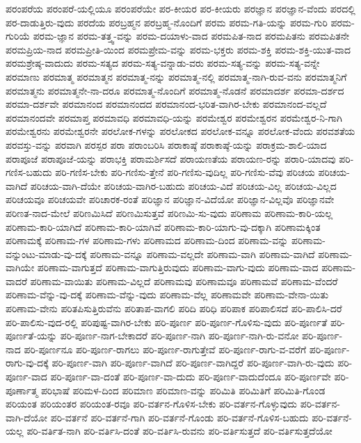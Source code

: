 {ಪರಂಪರೆಯ
ಪರಂಪರೆ-ಯಲ್ಲಿಯೂ
ಪರಂಪರೆಯೇ
ಪರ-ಕೀಯರ
ಪರ-ಕೀಯರು
ಪರಜ್ಞಾನ
ಪರಜ್ಞಾನ-ವೆಂದು
ಪರದಲ್ಲಿ
ಪರ-ದಾಡುತ್ತಿರು-ವುದು
ಪರದೆಯ
ಪರಬ್ರಹ್ಮನ
ಪರಬ್ರಹ್ಮ-ನೊಂದಿಗೆ
ಪರಮ
ಪರಮ-ಗತಿ-ಯನ್ನು
ಪರಮ-ಗುರಿ
ಪರಮ-ಗುರಿಯೆ
ಪರಮ-ಜ್ಞಾನ
ಪರಮ-ತತ್ತ್ವ-ವನ್ನು
ಪರಮ-ದಯಾಳು-ವಾದ
ಪರಮಪಿತ-ನಾದ
ಪರಮಪಿತನು
ಪರಮಪಿತನೇ
ಪರಮಪ್ರಿಯ-ನಾದ
ಪರಮಪ್ರೀತಿ-ಯಿಂದ
ಪರಮಪ್ರೇಮ-ವನ್ನು
ಪರಮ-ಭಕ್ತರು
ಪರಮ-ಶಕ್ತಿ
ಪರಮ-ಶಕ್ತಿ-ಯುತ-ವಾದ
ಪರಮಶ್ರೇಷ್ಠ-ವಾದುದು
ಪರಮ-ಸತ್ಯದ
ಪರಮ-ಸತ್ಯ-ವನ್ನಾಡು-ವರು
ಪರಮ-ಸತ್ಯ-ವನ್ನು
ಪರಮ-ಸತ್ಯ-ವನ್ನೇ
ಪರಮಾಣು
ಪರಮಾತ್ಮ
ಪರಮಾತ್ಮನ
ಪರಮಾತ್ಮ-ನನ್ನು
ಪರಮಾತ್ಮ-ನಲ್ಲಿ
ಪರಮಾತ್ಮ-ನಾಗಿ-ರುವ-ವನು
ಪರಮಾತ್ಮನಿಗೆ
ಪರಮಾತ್ಮನು
ಪರಮಾತ್ಮನೇ-ನಾ-ದರೂ
ಪರಮಾತ್ಮ-ನೊಂದಿಗೆ
ಪರಮಾತ್ಮ-ನೊಡನೆ
ಪರಮಾದರ್ಶ
ಪರಮಾ-ದರ್ಶದ
ಪರಮಾ-ದರ್ಶವೇ
ಪರಮಾನಂದ
ಪರಮಾನಂದದ
ಪರಮಾನಂದ-ಭರಿತ-ವಾಗಿರ-ಬೇಕು
ಪರಮಾನಂದ-ವಲ್ಲದೆ
ಪರಮಾನಂದವೇ
ಪರಮಾಪ್ತ
ಪರಮಾವಧಿ
ಪರಮಾವಧಿ-ಯನ್ನು
ಪರಮೇಶ್ವರ
ಪರಮೇಶ್ವರನ
ಪರಮೇಶ್ವರ-ನಿ-ಗಾಗಿ
ಪರಮೇಶ್ವರನು
ಪರಮೇಶ್ವರನೇ
ಪರಲೋಕ-ಗಳನ್ನು
ಪರಲೋಕದ
ಪರಲೋಕ-ವನ್ನೂ
ಪರಲೋಕ-ವೆಂದು
ಪರವಶತೆಯ
ಪರವಸ್ತು-ವನ್ನು
ಪರವಾಗಿ
ಪರಸ್ಪರ
ಪರಾ
ಪರಾಂಬರಿಸಿ
ಪರಾಕಾಷ್ಠೆ
ಪರಾಕಾಷ್ಠೆ-ಯನ್ನು
ಪರಾಕ್ರಮ-ಶಾಲಿ-ಯಾದ
ಪರಾಪೂಜೆ
ಪರಾಪೂಜೆ-ಯನ್ನು
ಪರಾಭಕ್ತಿ
ಪರಾಮರ್ಶಿಸದೆ
ಪರಾಯಣತೆಯ
ಪರಾಯಣ-ರನ್ನು
ಪರಾರಿ-ಯಾದವು
ಪರಿ-ಗಣಿಸ-ಬಹುದು
ಪರಿ-ಗಣಿಸ-ಬೇಕು
ಪರಿ-ಗಣಿಸು-ತ್ತೇನೆ
ಪರಿ-ಗಣಿಸು-ವುದಿಲ್ಲ
ಪರಿ-ಗಣಿಸು-ವೆವು
ಪರಿಚಯ
ಪರಿಚಯ-ವಾಗಿದೆ
ಪರಿಚಯ-ವಾಗಿ-ದೆಯೇ
ಪರಿಚಯ-ವಾಗಿರ-ಬಹುದು
ಪರಿಚಯ-ವಿದೆ
ಪರಿಚಯ-ವಿಲ್ಲ
ಪರಿಚಯ-ವಿಲ್ಲದ
ಪರಿಚಯವೂ
ಪರಿಚಯವೇ
ಪರಿಚಾರಕ-ರಂತೆ
ಪರಿಜ್ಞಾನ
ಪರಿಜ್ಞಾನ-ವಿದೆಯೋ
ಪರಿಜ್ಞಾನ-ವಿಲ್ಲವೊ
ಪರಿಜ್ಞಾನವೇ
ಪರಿಣತ-ನಾದ-ಮೇಲೆ
ಪರಿಣಮಿಸಿದೆ
ಪರಿಣಮಿಸುತ್ತವೆ
ಪರಿಣಮಿ-ಸು-ವುದು
ಪರಿಣಾಮ
ಪರಿಣಾಮ-ಕಾರಿ-ಯಲ್ಲ
ಪರಿಣಾಮ-ಕಾರಿ-ಯಾಗಿದೆ
ಪರಿಣಾಮ-ಕಾರಿ-ಯಾಗಿವೆ
ಪರಿಣಾಮ-ಕಾರಿ-ಯಾಗು-ವು-ದಕ್ಕಾಗಿ
ಪರಿಣಾಮಕ್ಕಿಂತ
ಪರಿಣಾಮಕ್ಕೆ
ಪರಿಣಾಮ-ಗಳ
ಪರಿಣಾಮ-ಗಳು
ಪರಿಣಾಮದ
ಪರಿಣಾಮ-ದಿಂದ
ಪರಿಣಾಮ-ವನ್ನು
ಪರಿಣಾಮ-ವನ್ನುಂಟು-ಮಾಡು-ವು-ದಕ್ಕೆ
ಪರಿಣಾಮ-ವನ್ನೂ
ಪರಿಣಾಮ-ವಲ್ಲದೇ
ಪರಿಣಾಮ-ವಾಗಿ
ಪರಿಣಾಮ-ವಾಗಿದೆ
ಪರಿಣಾಮ-ವಾಗಿಯೇ
ಪರಿಣಾಮ-ವಾಗುತ್ತದೆ
ಪರಿಣಾಮ-ವಾಗುತ್ತಿರುವುದು
ಪರಿಣಾಮ-ವಾಗು-ವುದು
ಪರಿಣಾಮ-ವಾದ
ಪರಿಣಾಮ-ವಾದರೆ
ಪರಿಣಾಮ-ವಾಯಿತು
ಪರಿಣಾಮ-ವಿಲ್ಲದೆ
ಪರಿಣಾಮವು
ಪರಿಣಾಮವೂ
ಪರಿಣಾಮವೆ
ಪರಿಣಾಮ-ವೆಂದರೆ
ಪರಿಣಾಮ-ವೆನ್ನು-ವು-ದಕ್ಕೆ
ಪರಿಣಾಮ-ವೆನ್ನು-ವುದು
ಪರಿಣಾಮ-ವೆಲ್ಲ
ಪರಿಣಾಮವೇ
ಪರಿಣಾಮ-ವೇನಾ-ಯಿತು
ಪರಿಣಾಮ-ವೇನು
ಪರಿತಪಿಸುತ್ತಿರುವೆನು
ಪರಿತಾಪ-ವಾಗಲಿ
ಪರಿದಿ
ಪರಿಧಿ
ಪರಿಪಾಕ
ಪರಿಪಾಲಿಸದೆ
ಪರಿ-ಪಾಲಿಸಿ-ದರೆ
ಪರಿ-ಪಾಲಿಸು-ವುದ-ರಲ್ಲಿ
ಪರಿಪುಷ್ಟ-ವಾಗಿರ-ಬೇಕು
ಪರಿ-ಪೂರ್ಣ
ಪರಿ-ಪೂರ್ಣ-ಗೊಳಿಸು-ವುದು
ಪರಿ-ಪೂರ್ಣತೆ
ಪರಿ-ಪೂರ್ಣತೆ-ಯನ್ನು
ಪರಿ-ಪೂರ್ಣ-ನಾಗ-ಬೇಕಾದರೆ
ಪರಿ-ಪೂರ್ಣ-ನಾಗಿ
ಪರಿ-ಪೂರ್ಣ-ನಾಗಿ-ರು-ವನೋ
ಪರಿ-ಪೂರ್ಣ-ನಾದ
ಪರಿ-ಪೂರ್ಣನೂ
ಪರಿ-ಪೂರ್ಣ-ರಾಗಲು
ಪರಿ-ಪೂರ್ಣ-ರಾಗುತ್ತೇವೆ
ಪರಿ-ಪೂರ್ಣ-ರಾಗು-ವ-ವರೆಗೆ
ಪರಿ-ಪೂರ್ಣ-ರಾಗು-ವು-ದಕ್ಕೆ
ಪರಿ-ಪೂರ್ಣ-ವಾಗಿ
ಪರಿ-ಪೂರ್ಣ-ವಾಗಿದೆ
ಪರಿ-ಪೂರ್ಣ-ವಾಗಿದ್ದರೆ
ಪರಿ-ಪೂರ್ಣ-ವಾಗಿ-ರು-ವುದು
ಪರಿ-ಪೂರ್ಣ-ವಾದ
ಪರಿ-ಪೂರ್ಣ-ವಾ-ದಂತೆ
ಪರಿ-ಪೂರ್ಣ-ವಾ-ದುದು
ಪರಿ-ಪೂರ್ಣ-ವಾದುದೆಂದೂ
ಪರಿ-ಪೂರ್ಣವೇ
ಪರಿ-ಪೂರ್ಣಾತ್ಮ
ಪರಿಭಾಷೆ
ಪರಿಮಳ-ದಿಂದ
ಪರಿಮಾಣ
ಪರಿಮಾಣ-ವನ್ನು
ಪರಿಮಿತಿ
ಪರಿಮಿತಿಗೆ
ಪರಿಮಿತಿ-ಗೊಂಡ
ಪರಿಯಂತ
ಪರಿಯಂತರ
ಪರಿಯಂತ-ರವೂ
ಪರಿ-ವರ್ತನ-ಗೊಳಿಸ-ಬೇಕು
ಪರಿ-ವರ್ತನ-ಗೊಳ್ಳುವುದು
ಪರಿ-ವರ್ತನ-ವಾಗಿ-ದೆಯೋ
ಪರಿ-ವರ್ತನೆ
ಪರಿ-ವರ್ತನೆ-ಗಾಗಿ
ಪರಿ-ವರ್ತನೆ-ಗೊಂಡು
ಪರಿ-ವರ್ತನೆ-ಗೊಳಿಸ-ಬಹುದು
ಪರಿ-ವರ್ತನೆ-ಯಲ್ಲ
ಪರಿ-ವರ್ತಿತ-ನಾಗಿ
ಪರಿ-ವರ್ತಿಸಿ-ದಂತೆ
ಪರಿ-ವರ್ತಿಸಿ-ರುವನು
ಪರಿ-ವರ್ತಿಸುತ್ತದೆ
ಪರಿ-ವರ್ತಿಸುತ್ತದೆಯೋ
}
